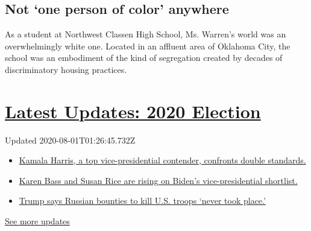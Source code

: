 \hypertarget{not-one-person-of-color-anywhere}{%
\subsection{Not `one person of color'
anywhere}\label{not-one-person-of-color-anywhere}}

As a student at Northwest Classen High School, Ms. Warren's world was an
overwhelmingly white one. Located in an affluent area of Oklahoma City,
the school was an embodiment of the kind of segregation created by
decades of discriminatory housing practices.

\hypertarget{latest-updates-2020-election}{%
\section{\texorpdfstring{\href{https://www.nytimes.com/2020/07/31/us/elections/biden-vs-trump.html?action=click\&pgtype=Article\&state=default\&region=MAIN_CONTENT_1\&context=storylines_live_updates}{Latest
Updates: 2020
Election}}{Latest Updates: 2020 Election}}\label{latest-updates-2020-election}}

Updated 2020-08-01T01:26:45.732Z

\begin{itemize}
\tightlist
\item
  \href{https://www.nytimes.com/2020/07/31/us/elections/biden-vs-trump.html?action=click\&pgtype=Article\&state=default\&region=MAIN_CONTENT_1\&context=storylines_live_updates\#link-29fdff45}{Kamala
  Harris, a top vice-presidential contender, confronts double
  standards.}
\item
  \href{https://www.nytimes.com/2020/07/31/us/elections/biden-vs-trump.html?action=click\&pgtype=Article\&state=default\&region=MAIN_CONTENT_1\&context=storylines_live_updates\#link-13ec3d9c}{Karen
  Bass and Susan Rice are rising on Biden's vice-presidential
  shortlist.}
\item
  \href{https://www.nytimes.com/2020/07/31/us/elections/biden-vs-trump.html?action=click\&pgtype=Article\&state=default\&region=MAIN_CONTENT_1\&context=storylines_live_updates\#link-49e9a016}{Trump
  says Russian bounties to kill U.S. troops `never took place.'}
\end{itemize}

\href{https://www.nytimes.com/2020/07/31/us/elections/biden-vs-trump.html?action=click\&pgtype=Article\&state=default\&region=MAIN_CONTENT_1\&context=storylines_live_updates}{See
more updates}

